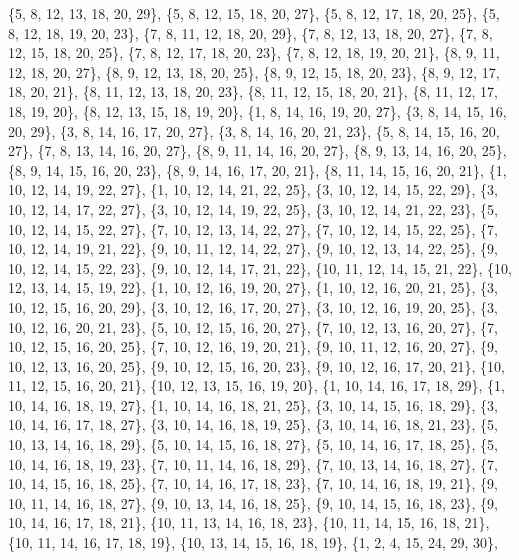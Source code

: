 \documentclass[11pt,a4paper]{article}
\begin{document}
{\{5, 8, 12, 13, 18, 20, 29\}, \{5, 8, 12, 15, 18, 20, 27\}, \{5, 8, 12, 17, 18, 20, 25\}, \{5, 8, 12, 18, 19, 20, 23\}, \{7, 8, 11, 12, 18, 20, 29\},
\{7, 8, 12, 13, 18, 20, 27\}, \{7, 8, 12, 15, 18, 20, 25\}, \{7, 8, 12, 17, 18, 20, 23\}, \{7, 8, 12, 18, 19, 20, 21\}, \{8, 9, 11, 12, 18, 20, 27\},
\{8, 9, 12, 13, 18, 20, 25\}, \{8, 9, 12, 15, 18, 20, 23\}, \{8, 9, 12, 17, 18, 20, 21\}, \{8, 11, 12, 13, 18, 20, 23\}, \{8, 11, 12, 15, 18, 20, 21\},
\{8, 11, 12, 17, 18, 19, 20\}, \{8, 12, 13, 15, 18, 19, 20\}, \{1, 8, 14, 16, 19, 20, 27\}, \{3, 8, 14, 15, 16, 20, 29\}, \{3, 8, 14, 16, 17, 20, 27\},
\{3, 8, 14, 16, 20, 21, 23\}, \{5, 8, 14, 15, 16, 20, 27\}, \{7, 8, 13, 14, 16, 20, 27\}, \{8, 9, 11, 14, 16, 20, 27\}, \{8, 9, 13, 14, 16, 20, 25\},
\{8, 9, 14, 15, 16, 20, 23\}, \{8, 9, 14, 16, 17, 20, 21\}, \{8, 11, 14, 15, 16, 20, 21\}, \{1, 10, 12, 14, 19, 22, 27\}, \{1, 10, 12, 14, 21, 22, 25\},
\{3, 10, 12, 14, 15, 22, 29\}, \{3, 10, 12, 14, 17, 22, 27\}, \{3, 10, 12, 14, 19, 22, 25\}, \{3, 10, 12, 14, 21, 22, 23\}, \{5, 10, 12, 14, 15, 22, 27\},
\{7, 10, 12, 13, 14, 22, 27\}, \{7, 10, 12, 14, 15, 22, 25\}, \{7, 10, 12, 14, 19, 21, 22\}, \{9, 10, 11, 12, 14, 22, 27\}, \{9, 10, 12, 13, 14, 22, 25\},
\{9, 10, 12, 14, 15, 22, 23\}, \{9, 10, 12, 14, 17, 21, 22\}, \{10, 11, 12, 14, 15, 21, 22\}, \{10, 12, 13, 14, 15, 19, 22\}, \{1, 10, 12, 16, 19, 20, 27\},
\{1, 10, 12, 16, 20, 21, 25\}, \{3, 10, 12, 15, 16, 20, 29\}, \{3, 10, 12, 16, 17, 20, 27\}, \{3, 10, 12, 16, 19, 20, 25\}, \{3, 10, 12, 16, 20, 21, 23\},
\{5, 10, 12, 15, 16, 20, 27\}, \{7, 10, 12, 13, 16, 20, 27\}, \{7, 10, 12, 15, 16, 20, 25\}, \{7, 10, 12, 16, 19, 20, 21\}, \{9, 10, 11, 12, 16, 20, 27\},
\{9, 10, 12, 13, 16, 20, 25\}, \{9, 10, 12, 15, 16, 20, 23\}, \{9, 10, 12, 16, 17, 20, 21\}, \{10, 11, 12, 15, 16, 20, 21\}, \{10, 12, 13, 15, 16, 19, 20\},
\{1, 10, 14, 16, 17, 18, 29\}, \{1, 10, 14, 16, 18, 19, 27\}, \{1, 10, 14, 16, 18, 21, 25\}, \{3, 10, 14, 15, 16, 18, 29\}, \{3, 10, 14, 16, 17, 18, 27\},
\{3, 10, 14, 16, 18, 19, 25\}, \{3, 10, 14, 16, 18, 21, 23\}, \{5, 10, 13, 14, 16, 18, 29\}, \{5, 10, 14, 15, 16, 18, 27\}, \{5, 10, 14, 16, 17, 18, 25\},
\{5, 10, 14, 16, 18, 19, 23\}, \{7, 10, 11, 14, 16, 18, 29\}, \{7, 10, 13, 14, 16, 18, 27\}, \{7, 10, 14, 15, 16, 18, 25\}, \{7, 10, 14, 16, 17, 18, 23\},
\{7, 10, 14, 16, 18, 19, 21\}, \{9, 10, 11, 14, 16, 18, 27\}, \{9, 10, 13, 14, 16, 18, 25\}, \{9, 10, 14, 15, 16, 18, 23\}, \{9, 10, 14, 16, 17, 18, 21\},
\{10, 11, 13, 14, 16, 18, 23\}, \{10, 11, 14, 15, 16, 18, 21\}, \{10, 11, 14, 16, 17, 18, 19\}, \{10, 13, 14, 15, 16, 18, 19\}, \{1, 2, 4, 15, 24, 29, 30\},
}
\end{document}
